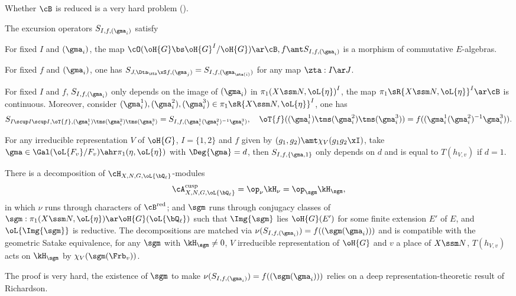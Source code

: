\documentclass[a4paper, twoside]{article}
\begin{document}
\begin{rmk}
	Whether $\cB$ is reduced is a very hard problem (\cite[Conjecture~12.12]{Lafforgue2018Chtoucas}).
\end{rmk}

\begin{thm}
	The excursion operators $S_{I,f,(\gma_{i})}$ satisfy
	\begin{itm}
		\item For fixed $I$ and $(\gma_{i})$, the map $\cO(\oH{G}\bs\oH{G}^{I}/\oH{G})\ar\cB,f\amt S_{I,f,(\gma_{i})}$ is a morphism of commutative $E$-algebras.
		\item For fixed $f$ and $(\gma_{i})$, one has $S_{J,\Dta_{\zta}\xS f,(\gma_{j})}=S_{I,f,(\gma_{\zta(i)})}$ for any map $\zta:I\ar J$.
		\item For fixed $I$ and $f$, $S_{I,f,(\gma_{i})}$ only depends on the image of $(\gma_{i})$ in $\pi_{1}{(X\ssm N,\oL{\eta})}^{I}$, the map $\pi_{1}\sR{X\ssm N, \oL{\eta}}^{I}\ar\cB$ is continuous. Moreover, consider $(\gma_{i}^{1}),(\gma_{i}^{2}),(\gma_{i}^{3})\in\pi_{1}\sR{X\ssm N,\oL{\eta}}^{I}$, one has
			\[
				S_{I\scup I\scup I,\oT{f},(\gma_{i}^{1})\tms(\gma_{i}^{2})\tms(\gma_{i}^{3})}=S_{I,f,(\gma_{i}^{1}(\gma_{i}^{2})^{-1}\gma_{i}^{3})},\quad \oT{f}((\gma_{i}^{1})\tms(\gma_{i}^{2})\tms(\gma_{i}^{3}))=f((\gma_{i}^{1}(\gma_{i}^{2})^{-1}\gma_{i}^{3})).
			\]
		\item For any irreducible representation $V$ of $\oH{G}$, $I=\{1,2\}$ and $f$ given by $(g_{1},g_{2})\amt\chi_{V}(g_{1}g_{2}\xI)$, take $\gma\in\Gal(\oL{F_{v}}/F_{v})\ahr\pi_{1}(\eta,\oL{\eta})$ with $\Deg{\gma}=d$, then $S_{I,f,\{\gma,1\}}$ only depends on $d$ and is equal to $T(h_{V,v})$ if $d=1$.
	\end{itm}
\end{thm}



\begin{thm}
	There is a decomposition of $\cH_{X,N,G,\oL{\bQ_{\ell}}}$-modules
	\[
		\cA_{X,N,G,\oL{\bQ_{\ell}}}^{\text{cusp}}=\op_{\nu}\kH_{\nu}=\op_{\sgm}\kH_{\sgm},
	\]
	in which $\nu$ runs through characters of $\cB^{\text{red}}$; and $\sgm$ runs through conjugacy classes of $\sgm:\pi_{1}(X\ssm N,\oL{\eta})\ar\oH{G}(\oL{\bQ_{\ell}})$ such that $\Img{\sgm}$ lies $\oH{G}(E')$ for some finite extension $E'$ of $E$, and $\oL{\Img{\sgm}}$ is reductive. The decompositions are matched via $\nu(S_{I,f,(\gma_{i})})=f((\sgm(\gma_{i})))$ and is compatible with the geometric Satake equivalence, for any $\sgm$ with $\kH_{\sgm}\neq0$, $V$ irreducible representation of $\oH{G}$ and $v$ a place of $X\ssm N$, $T(h_{V,v})$ acts on $\kH_{\sgm}$ by $\chi_{V}(\sgm(\Frb_{v}))$.
\end{thm}

\begin{rmk}
	The proof is very hard, the existence of $\sgm$ to make $\nu(S_{I,f,(\gma_{i})})=f((\sgm(\gma_{i})))$ relies on a deep representation-theoretic result of Richardson\cite{Richardson1988}.
\end{rmk}


\printref
\end{document}
